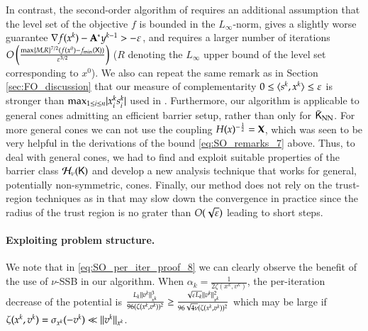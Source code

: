 In contrast, the second-order algorithm of \cite{HaeLiuYe18} requires an additional assumption that the level set of the objective $f$ is bounded in the $L_{\infty}$-norm, gives a slightly worse guarantee $\nabla f(x^{k})-{\mathbf A}^{\ast}y^{k-1} > -\varepsilon$, and requires a larger number of iterations $O\left(\frac{ \max\{M,R\}^{7/2}(f(x^{0}) - f_{\min}(\mathsf{X}))}{\varepsilon^{3/2}}\right)$ ($R$ denoting the $L_{\infty}$ upper bound of the level set corresponding to $x^{0}$).  We also can repeat the same remark as in Section \ref{sec:FO_discussion} that our measure of complementarity $0\leq \langle s^{k},x^{k}\rangle\leq \varepsilon$ is stronger than $\max_{1\leq i\leq n}\lvert x_{i}^{k}s_{i}^{k}\rvert$ used in \cite{HaeLiuYe18,NeiWr20}. Furthermore, our algorithm is applicable to general cones admitting an efficient barrier setup, rather than only for $\bar{\mathsf{K}}_{\text{NN}}$. For more general cones we can not use the coupling $H(x)^{-\frac{1}{2}} = \mathbf{X}$, which was seen to be very helpful in the derivations of the bound \eqref{eq:SO_remarks_7} above. Thus, to deal with general cones, we had to find and exploit suitable properties of the barrier class $\mathcal{H}_{\nu}(\mathsf{K})$ and develop a new analysis technique that works for general, potentially non-symmetric, cones. Finally, our method does not rely on the trust-region techniques as in \cite{HaeLiuYe18} that may slow down the convergence in practice since the radius of the trust region is no grater than $O(\sqrt{\varepsilon})$ leading to short steps.

\paragraph{Exploiting problem structure.}
We note that in \eqref{eq:SO_per_iter_proof_8} we can clearly observe the benefit of the use of $\nu$-SSB in our algorithm. When $\alpha_k=\frac{1}{2\zeta(x^k,v^k)}$, the per-iteration decrease of the potential is  $\frac{L_k\lVert v^{k}\rVert^{3}_{x^{k}}}{96 (\zeta(x^k,v^k))^2} \geq \frac{ \sqrt{\varepsilon L_k} \lVert v^{k}\rVert_{x^{k}}^2}{96 \sqrt{4\nu} (\zeta(x^k,v^k))^2} $ which may be large if $\zeta(x^k,v^k)=\sigma_{x^k}(-v^k) \ll \lVert v^{k}\rVert_{x^{k}}$.

